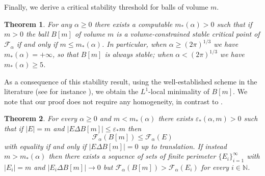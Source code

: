 \documentclass[a4paper,11pt,reqno]{amsart}
\numberwithin{equation}{section}
\newtheorem{theorem}{Theorem}[section]
\theoremstyle{remark}
\theoremstyle{definition}
\let\epsilon\varepsilon
\newcommand{\enf}{\mathcal{F}_{\alpha}}
\renewcommand{\leq}{\leqslant}
\renewcommand{\geq}{\geqslant}
\begin{document}
Finally, we derive a critical stability threshold for balls of volume $m$. 
	\begin{theorem}\label{thm: Stable Critical Threshold} For any $\alpha\geq 0$ there exists a computable $m_*(\alpha)>0$ such that if $m>0$ the ball $B[m]$ of volume $m$ is a volume-constrained stable critical point of $\enf$ if and only if $m \leq m_*(\alpha)$. In particular, when $\alpha \geq (2\pi)^{1/3}$ we have $m_*(\alpha)=+\infty$, so that $B[m]$ is always stable; when $\alpha <(2\pi)^{1/3}$ we have $m_*(\alpha)\geq 5$.
	\end{theorem}
As a consequence of this stability result, using the well-established scheme in the literature (see for instance \cite{AFM,BC,FFMMM}), we obtain the $L^1$-local minimality of $B[m]$. We note that our proof does not require any homogeneity, in contrast to \cite{BC,FFMMM}.
	\begin{theorem}\label{thm: L1 Local Minimality} For every $\alpha \geq 0$ and $m < m_*(\alpha)$ there exists $\epsilon_*(\alpha,m)>0$ such that if $|E|=m$ and $|E\Delta B[m]| \leq \epsilon_*m$ then
\[\enf(B[m])\leq \enf(E)\]
with equality if and only if $|E\Delta B[m]|=0$ up to translation. If instead $m>m_*(\alpha)$ then there exists a sequence of sets of finite perimeter $\{E_i\}_{i=1}^{\infty}$ with $|E_i|=m$ and $|E_i\Delta B[m]|\to 0$ but $\enf(B[m])>\enf(E_i)$ for every $i\in \mathbb{N}$.
	\end{theorem}
	
\end{document}
